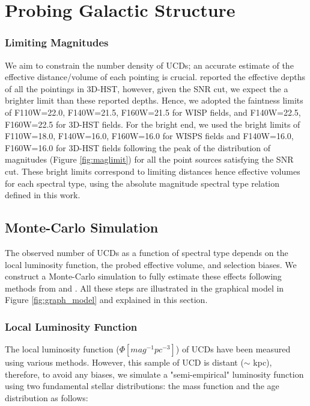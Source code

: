 \documentclass[manuscript]{aastex63}
\begin{document}
\section{Probing Galactic Structure}\label{sec:simulations}

\subsubsection{ Limiting Magnitudes}
We aim to constrain the number density of UCDs; an accurate estimate of the effective distance/volume of each pointing is crucial.  \citealt{Momcheva2016} reported the effective depths of all the pointings in 3D-HST, however, given the SNR cut, we expect the a brighter limit than these reported depths. Hence, we adopted the faintness limits of F110W=22.0, F140W=21.5, F160W=21.5 for WISP fields, and  F140W=22.5, F160W=22.5 for 3D-HST fields. For the bright end, we used the bright limits of F110W=18.0, F140W=16.0, F160W=16.0 for WISPS fields and F140W=16.0, F160W=16.0 for 3D-HST fields following the peak of the distribution of magnitudes (Figure \ref{fig:maglimit}) for all the point sources satisfying the SNR cut. These bright limits correspond to limiting distances hence effective volumes for each spectral type, using the absolute magnitude spectral type relation defined in this work. 

\subsection{Monte-Carlo Simulation}
The observed number of UCDs as a function of spectral type depends on the local luminosity function, the probed effective volume, and selection biases. We construct a Monte-Carlo simulation to fully estimate these effects following methods from \cite{1999ApJ...521..613R} and \cite{2004ApJS..155..191B}. All these steps are illustrated in the graphical model in Figure \ref{fig:graph_model} and explained in this section.

\subsubsection{ Local Luminosity Function} \label{step1simulation}
The local luminosity function ($\Phi [mag ^{-1} pc^{-3}]$) of UCDs have been measured using various methods. However, this sample of UCD is distant ($\sim$ kpc), therefore, to avoid any biases, we simulate a "semi-empirical" luminosity function using two fundamental stellar distributions: the mass function and the age distribution as follows: 
\end{document}
